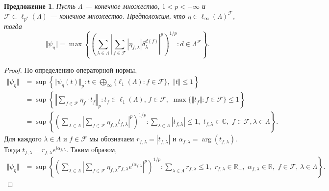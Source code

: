 \documentclass[12pt]{article}
\newtheorem{proposition}[theorem]{Предложение}
\begin{document}
\begin{proposition}\label{ExtMorphNorm}
    Пусть $\Lambda$ --- конечное множество, $1<p<+\infty$ 
    и $\mathcal{F}\subset\ell_{p^*}(\Lambda)$ --- конечное множество. 
    Предположим, что $\eta\in\ell_\infty(\Lambda)^\mathcal{F}$, тогда 
    \[
        \Vert \psi_{\eta}\Vert
        =\max\left\{
            \left(\sum_{\lambda\in\Lambda}
                \left|
                    \sum_{f\in\mathcal{F}} |\eta_{f,\lambda}| 
                    \delta_{\lambda}^{d(f)}
                \right|^p
            \right)^{1/p} : 
            d\in\Lambda^\mathcal{F}
        \right\}.
    \]
\end{proposition}
\begin{proof}
    По определению операторной нормы,
    \[
    \begin{aligned}
        \Vert\psi_{\eta}\Vert
        &=\sup\left\{
            \Vert\psi_{\eta}(t)\Vert_p:
            t\in \bigoplus_\infty\{\ell_1(\Lambda):f\in\mathcal{F}\},\,\,
            \Vert t\Vert\leq 1
        \right\} \\
        &=\sup\left\{
            \left \Vert\sum_{f\in\mathcal{F}}\eta_f\cdot t_f\right \Vert_p:
            t_f\in\ell_1(\Lambda),\, f\in\mathcal{F},\,\,
            \max\{\Vert t_f\Vert:f\in\mathcal{F}\}\leq 1
        \right\} \\
        &=\sup\left\{
            \left(\sum_{\lambda\in\Lambda}
                \left|
                    \sum_{f\in\mathcal{F}}\eta_{f,\lambda} t_{f,\lambda}
                \right|^p
            \right)^{1/p}:
            \sum_{\lambda\in\Lambda} |t_{f,\lambda}|\leq 1,\,\, 
            t_{f,\lambda}\in\mathbb{C},\,\, f\in\mathcal{F}, \lambda\in\Lambda
        \right\}.
    \end{aligned}
    \]
    Для каждого $\lambda\in\Lambda$ и $f\in\mathcal{F}$ мы обозначаем 
    $r_{f,\lambda}=|t_{f,\lambda}|$ 
    и $\alpha_{f,\lambda}=\operatorname{arg}(t_{f,\lambda})$. 
    Тогда $t_{f,\lambda}=r_{f,\lambda} e^{i \alpha_{f,\lambda}}$. Таким образом,
    \[
    \begin{aligned}
        \Vert \psi_{\eta}\Vert
        &=\sup\left\{
            \left(\sum_{\lambda\in\Lambda}
                \left|
                    \sum_{f\in\mathcal{F}}
                        \eta_{f,\lambda} r_{f,\lambda} e^{i \alpha_{f,\lambda}}
                \right|^p
            \right)^{1/p}:
            \sum_{\lambda\in\Lambda} r_{f,\lambda}\leq 1,\,\, 
            r_{f,\lambda}\in\mathbb{R}_+,\,\, 
            \alpha_{f,\lambda}\in\mathbb{R},\,\, 
            f\in\mathcal{F},\, \lambda\in\Lambda
        \right\}.
    \end{aligned}
    \]


\end{proof}
\end{document}
